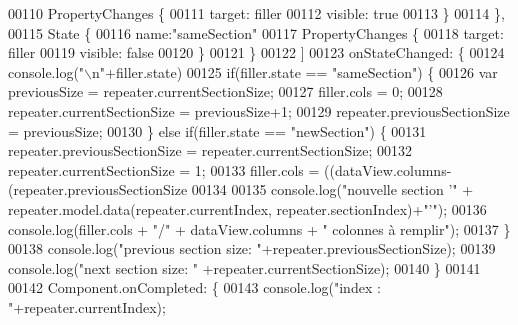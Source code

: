 \begin{DoxyCode}
00110 \textcolor{comment}{                        PropertyChanges \{}
00111 \textcolor{comment}{                            target: filler}
00112 \textcolor{comment}{                            visible: true}
00113 \textcolor{comment}{                        \}}
00114 \textcolor{comment}{                    \},}
00115 \textcolor{comment}{                    State \{}
00116 \textcolor{comment}{                        name:"sameSection"}
00117 \textcolor{comment}{                        PropertyChanges \{}
00118 \textcolor{comment}{                            target: filler}
00119 \textcolor{comment}{                            visible: false}
00120 \textcolor{comment}{                        \}}
00121 \textcolor{comment}{                    \}}
00122 \textcolor{comment}{                ]}
00123 \textcolor{comment}{                onStateChanged: \{}
00124 \textcolor{comment}{                    console.log("\(\backslash\)n"+filler.state)}
00125 \textcolor{comment}{                    if(filler.state == "sameSection") \{}
00126 \textcolor{comment}{                        var previousSize = repeater.currentSectionSize;}
00127 \textcolor{comment}{                        filler.cols = 0;}
00128 \textcolor{comment}{                        repeater.currentSectionSize = previousSize+1;}
00129 \textcolor{comment}{                        repeater.previousSectionSize = previousSize;}
00130 \textcolor{comment}{                    \} else if(filler.state == "newSection") \{}
00131 \textcolor{comment}{                        repeater.previousSectionSize = repeater.currentSectionSize;}
00132 \textcolor{comment}{                        repeater.currentSectionSize = 1;}
00133 \textcolor{comment}{                        filler.cols = ((dataView.columns-(repeater.previousSectionSize %
00134 \textcolor{comment}{}
00135 \textcolor{comment}{                        console.log("nouvelle section '" + repeater.model.data(repeater.currentIndex,
       repeater.sectionIndex)+"'");}
00136 \textcolor{comment}{                        console.log(filler.cols + "/" + dataView.columns + " colonnes à remplir");}
00137 \textcolor{comment}{                    \}}
00138 \textcolor{comment}{                    console.log("previous section size: "+repeater.previousSectionSize);}
00139 \textcolor{comment}{                    console.log("next section size: " +repeater.currentSectionSize);}
00140 \textcolor{comment}{                \}}
00141 \textcolor{comment}{}
00142 \textcolor{comment}{                Component.onCompleted: \{}
00143 \textcolor{comment}{                    console.log("index : "+repeater.currentIndex);}
}
\end{DoxyCode}
